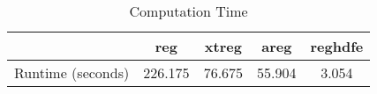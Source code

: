 \begin{table}[htbp]\centering
\caption{Computation Time}
\begin{tabular}{l*{4}{c}}
\hline\hline
            &         reg&       xtreg&        areg&     reghdfe\\
\hline
Runtime (seconds)&     226.175&      76.675&      55.904&       3.054\\
\hline\hline
\end{tabular}
\end{table}
